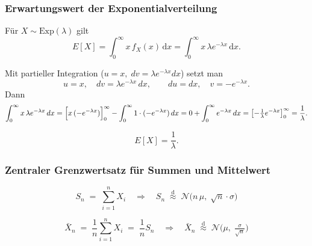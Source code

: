 \documentclass{beamer}
\begin{document}
\begin{frame}
  \frametitle{Erwartungswert der Exponentialverteilung}

  Für \(X\sim\mathrm{Exp}(\lambda)\) gilt
  \[
    E[X]
    = \int_{0}^{\infty} x\,f_X(x)\,\mathrm{d}x
    = \int_{0}^{\infty} x\,\lambda e^{-\lambda x}\,\mathrm{d}x.
  \]

  \medskip
  Mit partieller Integration (\(u=x,\;dv=\lambda e^{-\lambda x}dx\)) setzt man
  \[
    u = x,\quad dv = \lambda e^{-\lambda x}\,dx,
    \qquad
    du = dx,\quad v = -e^{-\lambda x}.
  \]
  Dann
  \[
    \int_{0}^{\infty} x\,\lambda e^{-\lambda x}\,dx
    = \Bigl[x\,(-e^{-\lambda x})\Bigr]_{0}^{\infty}
      - \int_{0}^{\infty} 1\cdot(-e^{-\lambda x})\,dx
    = 0 + \int_{0}^{\infty} e^{-\lambda x}\,dx
    = \left[-\tfrac{1}{\lambda}e^{-\lambda x}\right]_{0}^{\infty}
    = \frac{1}{\lambda}.
  \]

  \vfill
  \[
    \boxed{E[X] = \frac{1}{\lambda}.}
  \]
\end{frame}


\begin{frame}
  \frametitle{Zentraler Grenzwertsatz für Summen und Mittelwert}

  \[
    S_n \;=\;\sum_{i=1}^n X_i
    \quad\Longrightarrow\quad
    S_n \;\overset{\mathrm{d}}{\approx}\;
    \mathcal{N}\bigl(n\, \mu,\; \sqrt{n} \cdot \sigma \bigr)
  \]

  \[
    \bar X_n \;=\;\frac{1}{n}\sum_{i=1}^n X_i
    \;=\;\frac{1}{n}S_n
    \quad\Longrightarrow\quad
    \bar X_n \;\overset{\mathrm{d}}{\approx}\;
    \mathcal{N}\bigl(\mu,\; \tfrac{\sigma}{\sqrt{n}} \bigr)
  \]
\end{frame}
\end{document}
